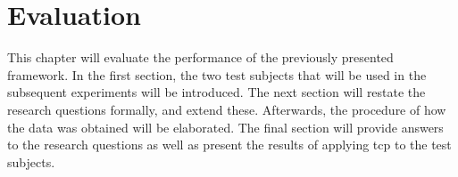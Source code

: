 
\chapter{Evaluation}
\label{ch:evaluation}
This chapter will evaluate the performance of the previously presented \velocity{} framework. In the first section, the two test subjects that will be used in the subsequent experiments will be introduced. The next section will restate the research questions formally, and extend these. Afterwards, the procedure of how the data was obtained will be elaborated. The final section will provide answers to the research questions as well as present the results of applying \acrlong{tcp} to the test subjects.




